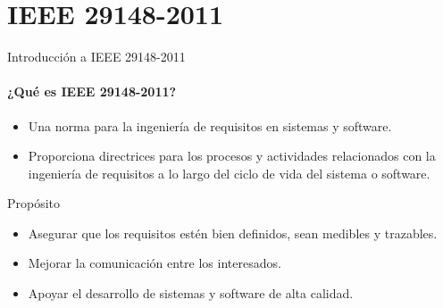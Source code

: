 \documentclass[
  24pt, %
  aspectratio=169, %
]{beamer}
\begin{document}
\section{IEEE 29148-2011}
\begin{frame}{Introducción a IEEE 29148-2011}
\framesubtitle{¿Qué es IEEE 29148-2011?}
\begin{itemize}
    \item Una norma para la ingeniería de requisitos en sistemas y software.
    \item Proporciona directrices para los procesos y actividades relacionados con la ingeniería de requisitos a lo largo del ciclo de vida del sistema o software.
\end{itemize}
\vspace{0.5cm}
Propósito
\begin{itemize}
    \item Asegurar que los requisitos estén bien definidos, sean medibles y trazables.
    \item Mejorar la comunicación entre los interesados.
    \item Apoyar el desarrollo de sistemas y software de alta calidad.
\end{itemize}
\end{frame}


\end{document}
